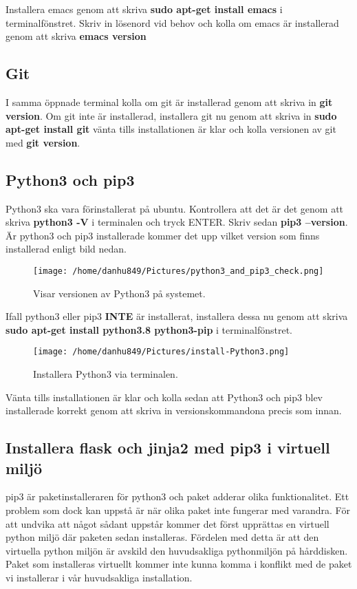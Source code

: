 \documentclass{TDP003mall}
\begin{document}
Installera emacs genom att skriva \textbf{sudo apt-get install emacs} i terminalfönstret. Skriv in lösenord vid behov och kolla om emacs är installerad genom att skriva \textbf{emacs \-\-version}

\subsection{Git}
I samma öppnade terminal kolla om git är installerad genom att skriva in \textbf{git \-\-version}. Om git inte är installerad, installera git nu genom att skriva in \textbf{sudo apt-get install git} vänta tills installationen är klar och kolla versionen av git med \textbf{git \-\-version}.

\subsection{Python3 och pip3}
Python3 ska vara förinstallerat på ubuntu. Kontrollera att det är det genom att skriva \textbf{python3 -V} i terminalen och tryck ENTER. Skriv sedan \textbf{pip3 --version}. Är python3 och pip3 installerade kommer det upp vilket version som finns installerad enligt bild nedan.
\begin{figure}[htbp]
  \centerline{\texttt{[image: /home/danhu849/Pictures/python3\_and\_pip3\_check.png]}}
  \caption{Visar versionen av Python3 på systemet.}
  \label{fig}
\end{figure}

Ifall python3 eller pip3 \textbf{INTE} är installerat, installera dessa nu genom att skriva \textbf{sudo apt-get install python3.8 python3-pip} i terminalfönstret.
\begin{figure}[htbp]
  \centerline{\texttt{[image: /home/danhu849/Pictures/install-Python3.png]}}
  \caption{Installera Python3 via terminalen.}
  \label{fig}
\end{figure}
Vänta tills installationen är klar och kolla sedan att Python3 och pip3 blev installerade korrekt genom att skriva in versionskommandona precis som innan.

\subsection{Installera flask och jinja2 med pip3 i virtuell miljö}
pip3 är paketinstalleraren för python3 och paket adderar olika funktionalitet. Ett problem som dock kan uppstå är när olika paket inte fungerar med varandra. För att undvika att något sådant uppstår kommer det först upprättas en virtuell python miljö där paketen sedan installeras. Fördelen med detta är att den virtuella python miljön är avskild den huvudsakliga pythonmiljön på hårddisken. Paket som installeras virtuellt kommer inte kunna komma i konflikt med de paket vi installerar i vår huvudsakliga installation.
\end{document}
